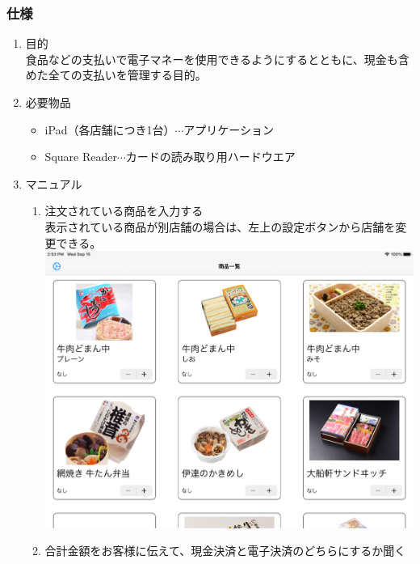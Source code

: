 \documentclass[dvipdfmx,jb5]{jreport}
\begin{document}
\subsubsection{仕様}
\begin{enumerate}
      \item 目的\\
            食品などの支払いで電子マネーを使用できるようにするとともに、現金も含めた全ての支払いを管理する目的。
      \item 必要物品
            \begin{itemize}
                  \item iPad（各店舗につき1台）$\cdots$アプリケーション
                  \item Square Reader$\cdots$カードの読み取り用ハードウエア
            \end{itemize}
      \item マニュアル
            \begin{enumerate}
                  \item 注文されている商品を入力する\\
                        表示されている商品が別店舗の場合は、左上の設定ボタンから店舗を変更できる。\\
                        \includegraphics[scale=0.15]{assets/square_top-interface.png}
                  \item 合計金額をお客様に伝えて、現金決済と電子決済のどちらにするか聞く\\

\end{enumerate}
\end{enumerate}
\end{document}
